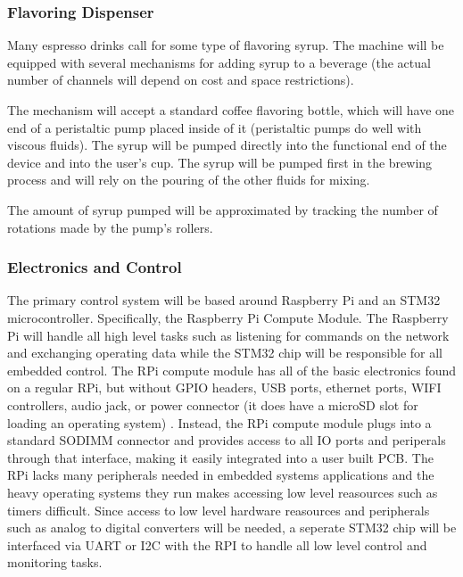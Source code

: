 \documentclass[conference]{IEEEtran}
\begin{document}


\subsubsection{Flavoring Dispenser}
Many espresso drinks call for some type of flavoring syrup. The machine will be equipped
with several mechanisms for adding syrup to a beverage (the actual number of
channels will depend on cost and space restrictions).

The mechanism will accept a standard coffee flavoring bottle, which will have one end
of a peristaltic pump placed inside of it (peristaltic pumps do well with viscous
fluids). The syrup will be pumped directly into the functional end of the device and
into the user's cup. The syrup will be pumped first in the brewing process and will rely
on the pouring of the other fluids for mixing.

The amount of syrup pumped will be approximated by tracking the number of rotations
made by the pump's rollers.

\subsubsection{Electronics and Control}
The primary control system will be based around Raspberry Pi and an STM32
microcontroller. Specifically, the
Raspberry Pi Compute Module. The Raspberry Pi will handle all high level tasks
such as listening for commands on the network and exchanging operating data while the
STM32 chip will be responsible for all embedded control. 
The RPi compute module has all of the basic electronics found on a regular RPi, but without GPIO headers, USB ports,
ethernet ports, WIFI controllers, audio jack, or power connector (it does have
a microSD slot for loading an operating system) \cite{RPi}.
Instead, the RPi compute module plugs into a standard SODIMM connector and provides access to all
IO ports and periperals through that interface, making it easily integrated into
a user built PCB. The RPi lacks many peripherals needed in embedded systems
applications and the heavy operating systems they run makes accessing low level
reasources such as timers difficult. Since access to low level hardware
reasources and peripherals such as analog to digital converters will be needed,
a seperate STM32 chip will be interfaced via UART or I2C with the RPI to handle
all low level control and monitoring tasks. 
\end{document}
